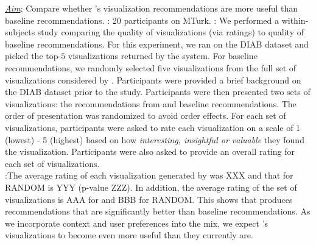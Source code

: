 {\it \underline{Aim}}: Compare whether \SeeDB's visualization 
recommendations 
are more useful than baseline recommendations.
: 20 participants on MTurk.
: We performed a within-subjects study comparing the quality of \SeeDB visualizations (via ratings) to quality of baseline recommendations.
For this experiment, we ran \SeeDB on the DIAB dataset and picked the top-$5$ visualizations returned by the system.
For baseline recommendations, we randomly selected five visualizations from
the full set of visualizations considered by \SeeDB.
Participants were provided a brief background on the DIAB dataset prior to the study.
Participants were then presented two sets of visualizations: the recommendations from \SeeDB and baseline recommendations. 
The order of presentation was randomized to avoid order effects.
For each set of visualizations, participants were asked to rate each visualization on a scale of 1 (lowest) - 5 (highest) based on how {\it interesting, insightful or valuable} they found the visualization.
Participants were also asked to provide an overall rating for each set of visualizations.\\
:The average rating of each visualization generated by \SeeDB was XXX and that for RANDOM is YYY (p-value ZZZ).
In addition, the average rating of the set of visualizations is AAA for \SeeDB and BBB for RANDOM.
This shows that \SeeDB produces recommendations that are significantly better than baseline recommendations.
As we incorporate context and user preferences
into the mix, we expect \SeeDB's visualizations
to become even more useful than they currently are.



